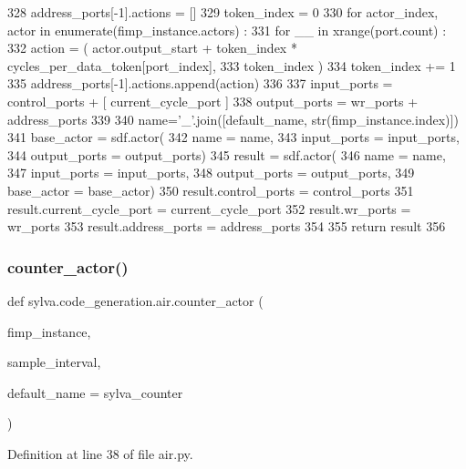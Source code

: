 \begin{DoxyCode}
328       address\_ports[-1].actions = []
329       token\_index = 0
330       \textcolor{keywordflow}{for} actor\_index, actor \textcolor{keywordflow}{in} enumerate(fimp\_instance.actors) :
331         \textcolor{keywordflow}{for} \_\_ \textcolor{keywordflow}{in} xrange(port.count) :
332           action = ( actor.output\_start + token\_index * cycles\_per\_data\_token[port\_index],
333             token\_index )
334           token\_index += 1
335           address\_ports[-1].actions.append(action)
336 
337   input\_ports = control\_ports + [ current\_cycle\_port ]
338   output\_ports = wr\_ports + address\_ports
339 
340   name=\textcolor{stringliteral}{'\_'}.join([default\_name, str(fimp\_instance.index)])
341   base\_actor = sdf.actor(
342     name = name,
343     input\_ports = input\_ports,
344     output\_ports = output\_ports)
345   result = sdf.actor(
346     name = name,
347     input\_ports = input\_ports,
348     output\_ports = output\_ports,
349     base\_actor = base\_actor)
350   result.control\_ports = control\_ports
351   result.current\_cycle\_port = current\_cycle\_port
352   result.wr\_ports = wr\_ports
353   result.address\_ports = address\_ports
354 
355   \textcolor{keywordflow}{return} result
356 
\end{DoxyCode}
\mbox{\label{namespacesylva_1_1code__generation_1_1air_a50394584613c57985bc89c8fa14a058f}} 
\subsubsection{\texorpdfstring{counter\+\_\+actor()}{counter\_actor()}}
{\footnotesize\ttfamily def sylva.\+code\+\_\+generation.\+air.\+counter\+\_\+actor (\begin{DoxyParamCaption}\item[{}]{fimp\+\_\+instance,  }\item[{}]{sample\+\_\+interval,  }\item[{}]{default\+\_\+name = {\ttfamily \textquotesingle{}sylva\+\_\+counter\textquotesingle{}} }\end{DoxyParamCaption})}



Definition at line 38 of file air.\+py.



